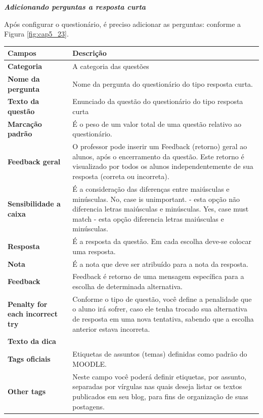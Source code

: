  \textit{\textbf{Adicionando perguntas a resposta curta}}

Após configurar o questionário, é preciso adicionar as perguntas: conforme a Figura \ref{fig:cap5_23}.

\newpage
\begin{longtable}{p{6cm}|p{9cm}}
     \hline
     \rowcolor[rgb]{0.8,0.8,0.8} \textbf{Campos} &  \textbf{Descrição}\\\hline
    \textbf{Categoria} & A categoria das questões \\\hline
    \textbf{Nome da pergunta} & Nome da pergunta do questionário do tipo resposta curta.  \\\hline
    \textbf{Texto da questão} & Enunciado da questão do questionário do tipo resposta curta \\\hline
    \textbf{Marcação padrão} & É o peso de um valor total de uma questão relativo ao questionário.\\\hline
    \textbf{Feedback geral} & O professor pode inserir um Feedback (retorno)  geral  ao alunos,  após o encerramento da questão. Este retorno é visualizado por todos os alunos independentemente de sua resposta (correta ou incorreta). \\\hline
    \textbf{Sensibilidade a caixa} & É a consideração das diferenças entre maiúsculas e minúsculas.
No, case is unimportant. - esta opção não diferencia letras maiúsculas e minúsculas.
Yes, case must match - esta opção diferencia letras maiúsculas e minúsculas.
\\\hline
    \textbf{Resposta} & É a resposta da questão. Em cada escolha deve-se colocar uma resposta. \\\hline
    \textbf{Nota} &  É a nota que deve ser atribuído para a nota da resposta.\\\hline
    \textbf{Feedback} & Feedback é retorno de uma mensagem específica para a escolha de determinada alternativa. \\\hline
    \textbf{Penalty for each incorrect try} & Conforme o tipo de questão, você define a  penalidade que o aluno irá sofrer, caso ele tenha trocado sua  alternativa de resposta em uma nova tentativa, sabendo que a escolha anterior estava incorreta.  \\\hline
    \textbf{Texto da dica} &         \\\hline
    \textbf{Tags oficiais} &  Etiquetas de assuntos (temas) definidas como padrão do MOODLE. \\\hline
    \textbf{Other tags} & Neste campo você poderá definir  etiquetas,  por assunto, separadas por vírgulas nas quais deseja listar os textos publicados em seu blog, para fins de organização de suas postagens.\\\hline
\end{longtable}%

